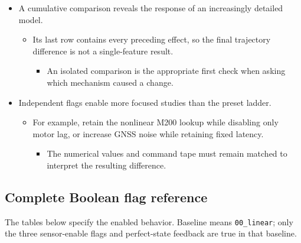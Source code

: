 \documentclass[10pt,letterpaper]{article}
\begin{document}
\begin{itemize}
\item
  A cumulative comparison reveals the response of an increasingly detailed model.

  \begin{itemize}
  \item
    Its last row contains every preceding effect, so the final trajectory difference is not a single-feature result.

    \begin{itemize}
    \item
      An isolated comparison is the appropriate first check when asking which mechanism caused a change.
    \end{itemize}
  \end{itemize}
\item
  Independent flags enable more focused studies than the preset ladder.

  \begin{itemize}
  \item
    For example, retain the nonlinear M200 lookup while disabling only motor lag, or increase GNSS noise while retaining fixed latency.

    \begin{itemize}
    \item
      The numerical values and command tape must remain matched to interpret the resulting difference.
    \end{itemize}
  \end{itemize}
\end{itemize}

\subsection{Complete Boolean flag reference}

The tables below specify the enabled behavior. Baseline means \texttt{00\_linear}; only the three sensor-enable flags and perfect-state feedback are true in that baseline.
\end{document}
